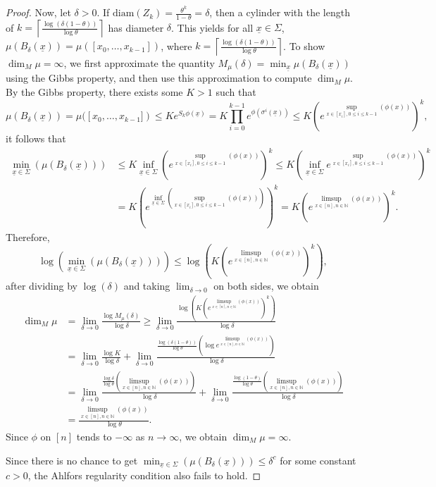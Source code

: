 \documentclass[11pt, reqno]{amsart}
\theoremstyle{plain}%
\theoremstyle{definition}
\theoremstyle{definition}
\def\N{\ensuremath{\mathbb N}}
\def\st{such that }
\def\ulx{\underline{x}}
\numberwithin{equation}{section}
\begin{document}
\begin{proof}
Now, let $\delta>0$. If $\text{diam}(Z_k)=\frac{\theta^k}{1-\theta}=\delta$, then a cylinder with the length of $k=\left\lceil\frac{\log(\delta(1-\theta))}{\log\theta}\right\rceil$ has diameter $\delta$. This yields for all $\ulx\in \Sigma$, $\mu\left(B_\delta(\ulx)\right)=\mu \left([x_0,\ldots,x_{k-1}]\right)$, where $k=\left\lceil\frac{\log(\delta(1-\theta))}{\log\theta}\right\rceil$. To show $\dim_M\mu=\infty$, we first approximate the quantity $M_\mu (\delta)=\min_{\ulx}\mu\left(B_\delta(\ulx)\right)$ using the Gibbs property, and then use this approximation to compute $\dim_M\mu$. By the Gibbs property, there exists some $K>1$ \st 
$$\mu\left(B_\delta(\ulx)\right)=\mu (\left[x_0,\ldots,x_{k-1}]\right)\le K e^{S_k\phi(\ulx)}= K \prod_{i=0}^{k-1}e^{\phi(\sigma^i(\ulx))}\le K \left(e^{\sup_{{x\in[x_i], 0\le i\le k-1}}(\phi(x))}\right)^k,$$
it follows that \begin{align*}
\min_{\ulx\in \Sigma}\left(\mu\left(B_\delta(\ulx)\right)\right)&\le K \inf_{\ulx\in \Sigma}\left(e^{\sup_{{x\in[x_i], 0\le i\le k-1}}(\phi(x))}\right)^k\le K \left(\inf_{\ulx\in \Sigma}e^{\sup_{{x\in[x_i], 0\le i\le k-1}}(\phi(x))}\right)^k\\&= K \left(e^{\inf_{\ulx\in \Sigma}\left(\sup_{{x\in[x_i], 0\le i\le k-1}}(\phi(x))\right)}\right)^k =K \left(e^{\limsup_{x\in [n],n\in\N}\left(\phi(x)\right)}\right)^k.\end{align*}
Therefore,
$$\log \left(\min_{\ulx\in \Sigma}\left(\mu\left(B_\delta(\ulx)\right)\right)\right)\le \log\left(K\left(e^{\limsup_{x\in [n],n\in\N}\left(\phi(x)\right)}\right)^k \right), $$
after dividing by $\log(\delta)$ and taking $\lim_{\delta\to0}$ on both sides, we obtain 
\begin{align*}
    \dim_M\mu&=\lim_{\delta\to0}\frac{\log M_{\mu}(\delta)}{\log\delta}\ge \lim_{\delta\to0}\frac{\log \left(K\left(e^{\limsup_{x\in [n],n\in\N}\left(\phi(x)\right)}\right)^k\right)}{\log\delta}\\&=\lim_{\delta\to0}\frac{\log K}{\log\delta}+ \lim_{\delta \to 0}\frac{\frac{\log(\delta(1-\theta))}{\log\theta} \left(\log e^{\limsup_{x\in [n],n\in\N}\left(\phi(x)\right)}\right)}{\log \delta}\\& =\lim_{\delta \to 0}\frac{\frac{\log\delta}{\log\theta} \left({\limsup_{x\in [n],n\in\N}\left(\phi(x)\right)}\right)}{\log \delta}+\lim_{\delta \to 0}\frac{\frac{\log(1-\theta)}{\log\theta} \left( {\limsup_{x\in [n],n\in\N}\left(\phi(x)\right)}\right)}{\log \delta}\\&=\frac{{\limsup_{x\in [n],n\in\N}\left(\phi(x)\right)}}{\log \theta}. 
\end{align*}
Since $\phi$ on $[n]$ tends to $-\infty$  as $n\to \infty$, we obtain $\dim_M\mu= \infty$.

Since there is no chance to get $\min_{\ulx\in \Sigma}\left(\mu\left(B_\delta(\ulx)\right)\right)\le \delta^{c}$ for some constant $c>0$, the Ahlfors regularity condition also fails to hold.
\end{proof}
\end{document}
